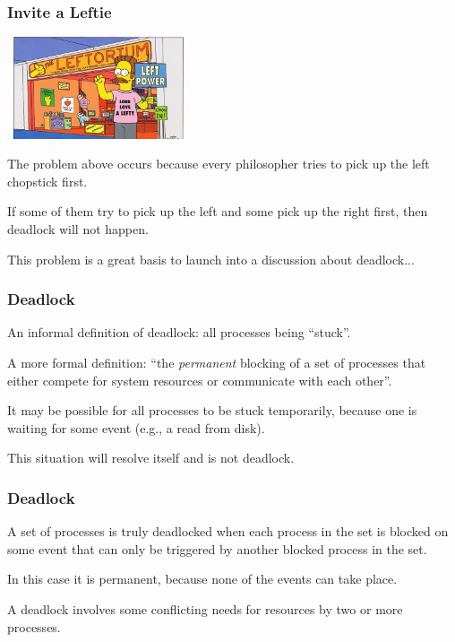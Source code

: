 \begin{frame}
\frametitle{Invite a Leftie}

\begin{center}
	\includegraphics[width=0.4\textwidth]{images/leftorium.jpg}
\end{center}

The problem above occurs because every philosopher tries to pick up the left chopstick first. 

If some of them try to pick up the left and some pick up the right first, then deadlock will not happen.

This problem is a great basis to launch into a discussion about deadlock...

\end{frame}



\begin{frame}
\frametitle{Deadlock}

An informal definition of deadlock: all processes being ``stuck''. 

A more formal definition: ``the \textit{permanent} blocking of a set of processes that either compete for system resources or communicate with each other''.

It may be possible for all processes to be stuck temporarily, because one is waiting for some event (e.g., a read from disk).

This situation will resolve itself and is not deadlock. 

\end{frame}


\begin{frame}
\frametitle{Deadlock}
 A set of processes is truly deadlocked when each process in the set is blocked on some event that can only be triggered by another blocked process in the set. 
 
 In this case it is permanent, because none of the events can take place.

A deadlock involves some conflicting needs for resources by two or more processes. 

\end{frame}

